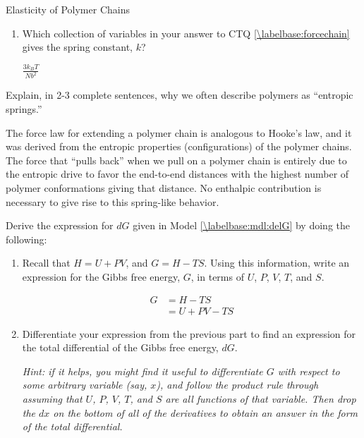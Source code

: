 \begin{activity}{Elasticity of Polymer Chains}
\begin{ctqs}
\begin{enumerate}
			\item Which collection of variables in your answer to CTQ \ref{\labelbase:forcechain} gives the spring constant, $k$?
		
				\begin{solution}[0.25in]{}
					$\frac{3k_BT}{Nb^2}$
				\end{solution}
			
		\end{enumerate}
		
	\question Explain, in 2-3 complete sentences, why we often describe polymers as ``entropic springs.''
	
		\begin{solution}[2.5in]{}
			The force law for extending a polymer chain is analogous to Hooke's law, and it was derived from the entropic properties (configurations) of the polymer chains.  The force that ``pulls back'' when we pull on a polymer chain is entirely due to the entropic drive to favor the end-to-end distances with the highest number of polymer conformations giving that distance.  No enthalpic contribution is necessary to give rise to this spring-like behavior.
		\end{solution}
	
\end{ctqs}
	
	
\begin{exercises}
	\exercise \label{\labelbase:exc:dG} Derive the expression for $dG$ given in Model \ref{\labelbase:mdl:delG} by doing the following:
	
		\begin{enumerate}
			\item Recall that $H = U+ PV$, and $G=H-TS$.  Using this information, write an expression for the Gibbs free energy, $G$, in terms of $U$, $P$, $V$, $T$, and $S$.
			
				\begin{solution}{}
					\begin{align*}
						G &= H-TS \\
							&= U + PV - TS
					\end{align*}
				\end{solution}
			
			\item Differentiate your expression from the previous part to find an expression for the total differential of the Gibbs free energy, $dG$.
			
				\emph{Hint: if it helps, you might find it useful to differentiate $G$ with respect to some arbitrary variable (say, $x$), and follow the product rule through assuming that $U$, $P$, $V$, $T$, and $S$ are all functions of that variable.  Then drop the $dx$ on the bottom of all of the derivatives to obtain an answer in the form of the total differential.}
			

\end{enumerate}
\end{exercises}
\end{activity}
